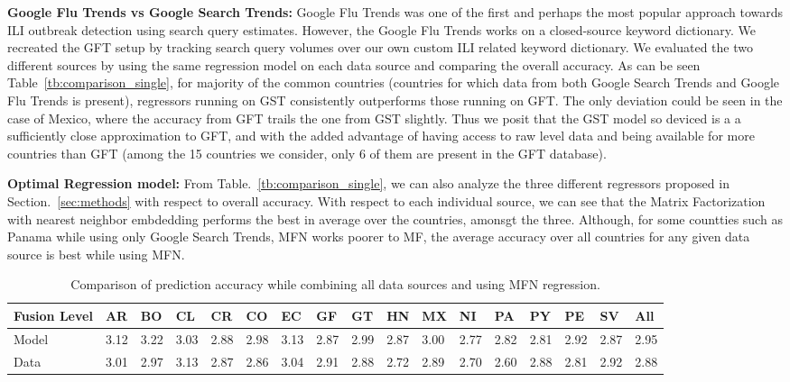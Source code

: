 {\noindent \textbf{Google Flu Trends vs Google Search Trends: }}  Google Flu Trends
was one of the first and perhaps the most popular approach 
towards ILI outbreak detection using search query estimates. However, the Google
Flu Trends works on a closed-source keyword dictionary. We recreated the GFT setup 
by tracking search query volumes over our own custom ILI related keyword dictionary.
We evaluated the two different sources by using the same regression model on each 
data source and comparing the overall accuracy. As can be seen Table~\ref{tb:comparison_single},
for majority of the common countries (countries for which data from both Google Search Trends
and Google Flu Trends is present), regressors running on GST consistently 
outperforms those running on GFT. The only deviation could be seen in the case of Mexico, where the
accuracy from GFT trails the one from GST slightly. 
Thus we posit that the GST model so deviced is a a sufficiently close approximation to GFT, and 
with the added advantage of having access to raw level data and being available for more countries 
than GFT (among the 15 countries we consider, only 6 of them are present in the GFT database).


{\noindent \textbf{Optimal Regression model: }} From Table.~\ref{tb:comparison_single}, we can also
analyze the three different regressors proposed in Section.~\ref{sec:methods} with respect to overall accuracy.
With respect to each individual source, we can see that the Matrix Factorization with nearest 
neighbor embdedding performs the best in average over the countries, amonsgt the three.
Although, for some countties such as Panama while using only Google Search Trends, MFN works poorer to 
MF, the average accuracy over all countries for any given data source is best while using MFN.

\begin{table}[tb!]
  \centering
  \caption{\label{tb:comparison_ensemble}Comparison of prediction accuracy while combining all data sources
  and using MFN regression.}
\vspace{1em}
  \begin{tabular}{|p{1.5cm}|*{16}{l|}}
\hline
Fusion Level& AR & BO & CL & CR & CO & EC & GF & GT & HN & MX & NI & PA & PY & PE & SV & All\\
\hline \hline
Model       &3.12&3.22&3.03&2.88&2.98&3.13&2.87&2.99&2.87&3.00&2.77&2.82&2.81&2.92&2.87&2.95\\ 
Data        &3.01&2.97&3.13&2.87&2.86&3.04&2.91&2.88&2.72&2.89&2.70&2.60&2.88&2.81&2.92&2.88\\ 
\hline
\end{tabular}
\end{table}

